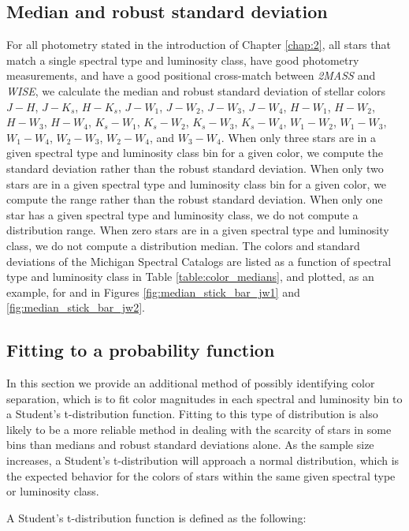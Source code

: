 \subsection{Median and robust standard deviation} \label{subsec:median_stats}
For all photometry stated in the introduction of Chapter \ref{chap:2}, all stars that match a single spectral type and luminosity class, have good photometry measurements, and have a good positional cross-match between \textit{2MASS} and \textit{WISE}, we calculate the median and robust standard deviation of stellar colors $J-H$, $J-K_{s}$, $H-K_{s}$, $J-W_{1}$, $J-W_{2}$, $J-W_{3}$, $J-W_{4}$, $H-W_{1}$, $H-W_{2}$, $H-W_{3}$, $H-W_{4}$, $K_{s}-W_{1}$, $K_{s}-W_{2}$, $K_{s}-W_{3}$, $K_{s}-W_{4}$, $W_{1}-W_{2}$, $W_{1}-W_{3}$, $W_{1}-W_{4}$, $W_{2}-W_{3}$, $W_{2}-W_{4}$, and $W_{3}-W_{4}$. When only three stars are in a given spectral type and luminosity class bin for a given color, we compute the standard deviation rather than the robust standard deviation.  When only two stars are in a given spectral type and luminosity class bin for a given color, we compute the range rather than the robust standard deviation.  When only one star has a given spectral type and luminosity class, we do not compute a distribution range.  When zero stars are in a given spectral type and luminosity class, we do not compute a distribution median.  The colors and standard deviations of the Michigan Spectral Catalogs are listed as a function of spectral type and luminosity class in Table \ref{table:color_medians}, and plotted, as an example, for \jwone and \jwtwo in Figures \ref{fig:median_stick_bar_jw1} and \ref{fig:median_stick_bar_jw2}.

\subsection{Fitting to a probability function} \label{subsec:tdist_stats}
In this section we provide an additional method of possibly identifying color separation, which is to fit color magnitudes in each spectral and luminosity bin to a Student's t-distribution function. Fitting to this type of distribution is also likely to be a more reliable method in dealing with the scarcity of stars in some bins than medians and robust standard deviations alone. As the sample size increases, a Student's t-distribution will approach a normal distribution, which is the expected behavior for the colors of stars within the same given spectral type or luminosity class.

A Student's t-distribution function is defined as the following:

